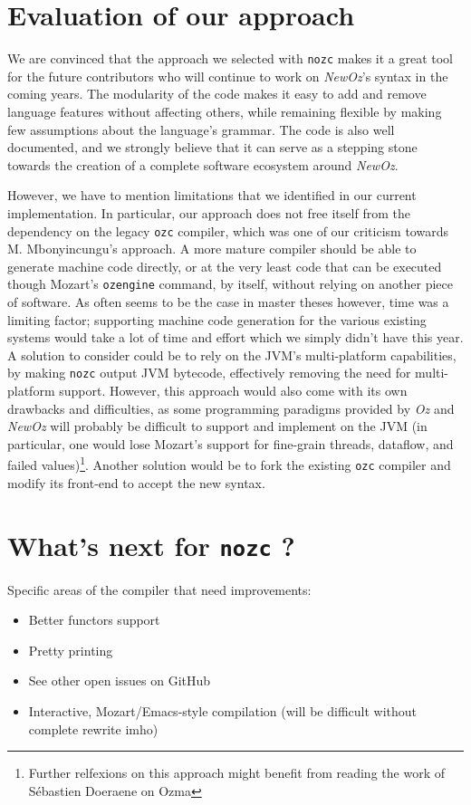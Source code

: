 \section{Evaluation of our approach}\label{sec:ch3-pros-cons}
We are convinced that the approach we selected with \texttt{nozc} makes it a great tool for the future contributors who will continue to work on \textit{NewOz}'s syntax in the coming years.
The modularity of the code makes it easy to add and remove language features without affecting others, while remaining flexible by making few assumptions about the language's grammar.
The code is also well documented, and we strongly believe that it can serve as a stepping stone towards the creation of a complete software ecosystem around \textit{NewOz}.\newline

However, we have to mention limitations that we identified in our current implementation.
In particular, our approach does not free itself from the dependency on the legacy \texttt{ozc} compiler, which was one of our criticism towards M. Mbonyincungu's approach.
A more mature compiler should be able to generate machine code directly, or at the very least code that can be executed though Mozart's \texttt{ozengine} command, by itself, without relying on another piece of software.
As often seems to be the case in master theses however, time was a limiting factor;
supporting machine code generation for the various existing systems would take a lot of time and effort which we simply didn't have this year.\newline
A solution to consider could be to rely on the JVM's multi-platform capabilities, by making \texttt{nozc} output JVM bytecode, effectively removing the need for multi-platform support.
However, this approach would also come with its own drawbacks and difficulties, as some programming paradigms provided by \textit{Oz} and \textit{NewOz} will probably be difficult to support and implement on the JVM (in particular, one would lose Mozart's support for fine-grain threads, dataflow, and failed values)\footnote{Further relfexions on this approach might benefit from reading the work of Sébastien Doeraene on Ozma\cite{Ozma}}.\newline
Another solution would be to fork the existing \texttt{ozc} compiler and modify its front-end to accept the new syntax.

\section{What's next for \texttt{nozc} ?}\label{sec:ch3-next}
Specific areas of the compiler that need improvements:
\begin{itemize}
    \item Better functors support
    \item Pretty printing
    \item See other open issues on GitHub
    \item Interactive, Mozart/Emacs-style compilation (will be difficult without complete rewrite imho)
\end{itemize}

